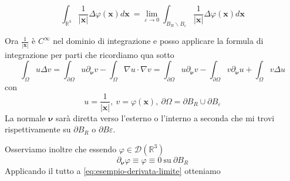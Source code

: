 \documentclass[10pt,a4paper,twoside,openright]{book}
\newcommand{\x}{\mathbf{x}}
\begin{document}
\begin{enumerate}
\begin{figure}[htpb]
\begin{tikzpicture}[x=0.75pt,y=0.75pt,yscale=-1,xscale=1]
	      		
	      	\end{tikzpicture}
	      \end{figure}
	      \FloatBarrier
	      \begin{equation}
	      	\int _{\mathbb{R}^{3}}\frac{1}{| \x| } \Delta \varphi (\x) d\x \ =\lim _{\varepsilon \rightarrow 0}\int _{B_{R} \backslash B_{\varepsilon }}\frac{1}{| \x| } \Delta \varphi (\x) d\x
	      	\label{eq:esempio-derivata-limite}
	      \end{equation}
\end{enumerate}

Ora $\displaystyle \frac{1}{| \x| }$ è $\displaystyle C^{\infty }$ nel dominio di integrazione e posso applicare la formula di integrazione per parti che ricordiamo qua sotto
\begin{equation*}
	\int _{\Omega } u\Delta v=\int _{\partial \Omega } u\partial _{\bm{\nu}} v-\int _{\Omega } \nabla u\cdotp \nabla v=\int _{\partial \Omega } u\partial _{\bm{\nu }} v-\int _{\partial \Omega } v\partial _{\bm{\nu }} u+\int _{\Omega } v\Delta u
\end{equation*}
con 
\begin{equation*}
	u=\frac{1}{| \x| } ,\ v=\varphi (\x) ,\ \partial \Omega =\partial B_{R} \cup \partial B_{\varepsilon }
\end{equation*}
La normale $\displaystyle \bm{\nu }$ sarà diretta verso l'esterno o l'interno a seconda che mi trovi rispettivamente su $\displaystyle \partial B_{R}$ o $\displaystyle \partial B\varepsilon $.

Osserviamo inoltre che essendo $\displaystyle \varphi \in \mathcal{D}\left(\mathbb{R}^{3}\right)$
\begin{equation*}
	\partial _{\bm{\nu }} \varphi \equiv \varphi \equiv 0\ \text{su} \ \partial B_{R}
\end{equation*}
Applicando il tutto a \eqref{eq:esempio-derivata-limite} otteniamo
\end{document}
